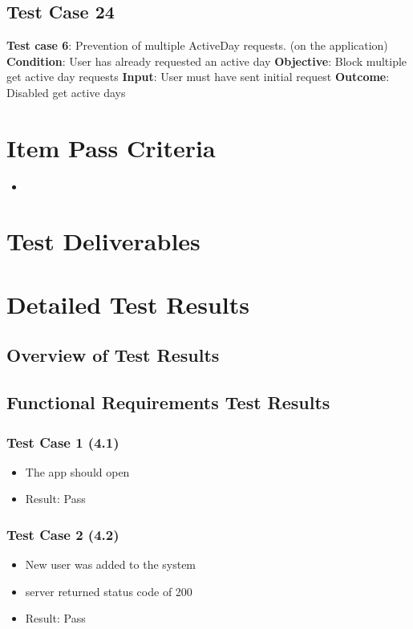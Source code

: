 \documentclass[11pt]{article}
\begin{document}
\subsection{Test Case 24}
\textbf{Test case 6}: Prevention of multiple ActiveDay requests. (on the application) \newline
\textbf{Condition}: User has already requested an active day \newline
\textbf{Objective}: Block multiple get active day requests  \newline
\textbf{Input}: User must have sent initial request \newline
\textbf{Outcome}: Disabled get active days   \newline

\section{Item Pass Criteria}
\begin{itemize}
	\item 	
\end{itemize}

\section{Test Deliverables}

\section{Detailed Test Results}
\subsection{Overview of Test Results}

\subsection{Functional Requirements Test Results}

\subsubsection{Test Case 1 (4.1)}
\begin{itemize}
	\item The app should open
	\item Result: Pass
\end{itemize}

\subsubsection{Test Case 2 (4.2)}
\begin{itemize}
	\item New user was added to the system
	\item server returned status code of 200
	\item 	Result: Pass
\end{itemize}
\end{document}
